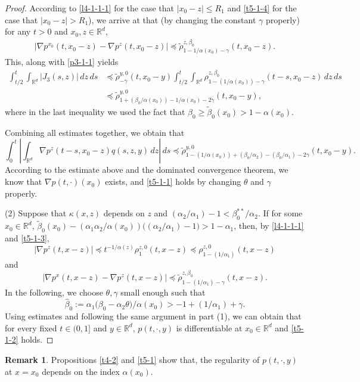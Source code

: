 \documentclass[a4paper,11pt]{amsart}
\renewcommand{\le}{\leqslant}
\renewcommand{\ge}{\geqslant}
\newcommand{\R}{\mathds R}
\newcommand{\B}{\beta}
\newcommand{\T}{\theta}
\newcommand{\p}{\preceq}
\newcommand{\K}{\kappa}
\newcommand{\A}{\alpha}
\newcommand{\G}{\gamma}
\def\wh{\widehat}
\theoremstyle{definition}
\newtheorem{remark}[theorem]{Remark}
\begin{document}
\begin{proof}
According to \eqref{l4-1-1-1} for the case that $|x_0-z|\le R_1$ and \eqref{t5-1-4} for the case
that $|x_0-z|>R_1$), we arrive at that (by changing the constant $\G$ properly) for any $t>0$ and $x_0,z\in \R^d$,
\begin{align*}
\left|\nabla p^{x_0}(t,x_0-z)-\nabla p^z(t,x_0-z)\right|\p
\tilde \rho^{z,\B_0}_{1-1/\A(x_0)-\G}(t,x_0-z).
\end{align*}
This, along with \eqref{p3-1-1} yields
\begin{align*}
\int_{t/2}^t\int_{\R^d}|J_3(s,z)|\,dz\,ds
&\p \tilde \rho^{y,0}_{-\G}(t,x_0-y)\int_{t/2}^t\int_{\R^d} \rho^{z,\B_0}_{1-(1/\A(x_0))-\G}(t-s,x_0-z)\,dz\,ds\\
&\p \tilde \rho^{y,0}_{1+(\B_0/\A(x_0))-1/\A(x_0)-2\G}(t,x_0-y),
\end{align*} where in the last inequality we used the fact that $\B_0\ge\tilde \B_0(x_0)>1-\A(x_0)$.

Combining all estimates together, we obtain that
\begin{equation*}
\int_0^t \left|\int_{\R^d}\nabla p^z(t-s,x_0-z)q(s,z,y)\,dz\right|\,ds
\p  \tilde \rho^{y,0}_{1-(1/\A(x_0))+(\B_0/\A_2)-(\B_0/\A_1)-2\G}(t,x_0-y).
\end{equation*}
According to the estimate above and the dominated convergence theorem,  we know that
$\nabla p(t,\cdot)(x_0)$ exists, and \eqref{t5-1-1} holds by changing $\T$ and $\G$ properly.


(2) Suppose that $\K(x,z)$ depends on $z$ and
${(\A_2/\A_1)}-1<{\B_0^{**}}/{\A_2}$. If for some $x_0\in \R^d$,
$\tilde \B_0(x_0)-({\A_1\A_2}/{\A(x_0)})
\big(({\A_2}/{\A_1})-1\big)>1-\A_1$, then, by \eqref{l4-1-1-1} and
\eqref{t5-1-3},
$$
|\nabla p^z(t,x-z)|\p t^{-{1}/{\A(z)}}\rho^{z,0}_1(t,x-z)\p
\rho^{z,0}_{1-(1/\A_1)}(t,x-z)
$$
and $$
|\nabla p^x(t,x-z)-\nabla p^z(t,x-z)|\p
\tilde \rho^{z,\B_0}_{1-(1/\A_1)-\G}(t,x-z).
$$
In the following, we choose $\theta,\gamma$ small enough such that
$$\wh \B_0:={\A_1}\big(\B_0-\A_2\theta\big)/{\A(x_0)}>-1+(1/\A_1)+\G.$$
Using estimates and following the same argument in part (1), we can obtain that
for every fixed $t \in (0,1]$ and $y \in \R^d$, $p(t,\cdot,y)$ is differentiable at $x_0\in \R^d$ and
\eqref{t5-1-2} holds.
\end{proof}
\begin{remark}
Propositions \ref{t4-2} and \ref{t5-1} show that,
the regularity of $p(t,\cdot,y)$ at
$x=x_0$ depends on the index $\A(x_0)$.
\end{remark}
\end{document}
